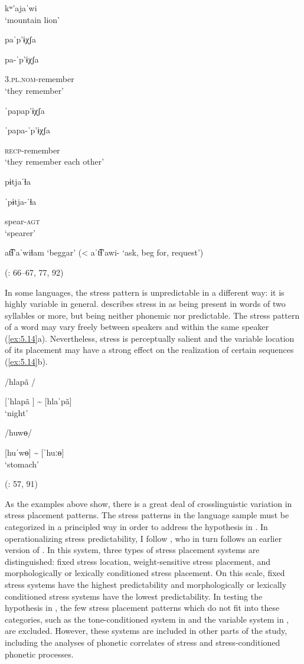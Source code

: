 \ex  kʷ’ajaˈwi\\
\glt ‘mountain lion’

\ex  paˈp’ɨχʃa

pa-ˈp’ɨχʃa

3.\textsc{pl.nom}-remember\\
\glt ‘they remember’

\ex  ˈpapap’ɨχʃa

ˈpapa-ˈp’ɨχʃa

\textsc{recp}-remember\\
\glt ‘they remember each other’

\ex  pɨtjaˈɬa

ˈpɨtja-ˈɬa

spear-\textsc{agt}\\
\glt ‘spearer’

\ex  at͡ɬ’aˈwiɬam ‘beggar’ (< aˈt͡ɬ’awi- ‘ask, beg for, request’)

(\citealt{HargusBeavert2005}: 66--67, 77, 92)
\z
\z

  In some languages, the stress pattern is unpredictable in a different way: it is highly variable in general. \citet{Marmion2010} describes stress in  as being present in words of two syllables or more, but being neither phonemic nor predictable. The stress pattern of a word may vary freely between speakers and within the same speaker (\ref{ex:5.14}a). Nevertheless, stress is perceptually salient and the variable location of its placement may have a strong effect on the realization of certain sequences (\ref{ex:5.14}b).

\ea\label{ex:5.14}

\ea  /hlapã /

[ˈhlapã ] {\textasciitilde} [hlaˈpã]\\
\glt ‘night’

\ex  /huwɵ/

[huˈwɵ] {\textasciitilde} [ˈhuːɵ]\\
\glt ‘stomach’

(\citealt{Marmion2010}: 57, 91)
\z
\z

  As the examples above show, there is a great deal of crosslinguistic variation in stress placement patterns. The stress patterns in the language sample must be categorized in a principled way in order to address the hypothesis in . In operationalizing stress predictability, I follow \citet{Schiering2007}, who in turn follows an earlier version of \citet{GoedemansvanderHulst2013a}. In this system, three types of stress placement systems are distinguished: fixed stress location, weight-sensitive stress placement, and morphologically or lexically conditioned stress placement. On this scale, fixed stress systems have the highest predictability and morphologically or lexically conditioned stress systems have the lowest predictability. In testing the hypothesis in , the few stress placement patterns which do not fit into these categories, such as the tone-conditioned system in   and the variable system in  , are excluded. However, these systems are included in other parts of the study, including the analyses of phonetic correlates of stress and stress-conditioned phonetic processes.

